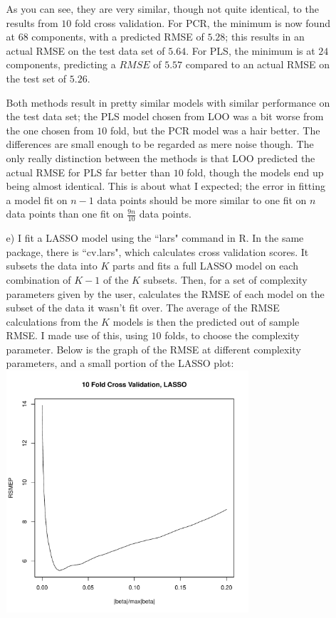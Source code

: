 \documentclass[11pt]{article}
\theoremstyle{definition}
\begin{document}
\begin{itemize}
\begin{itemize}
                As you can see, they are very similar, though not quite identical, to the results from $10$ fold cross validation. For PCR, the minimum is now found at $68$ components, with a predicted RMSE of $5.28$; this results in an actual RMSE on the test data set of $5.64$. For PLS, the minimum is at $24$ components, predicting a $RMSE$ of $5.57$ compared to an actual RMSE on the test set of $5.26$. \par
                Both methods result in pretty similar models with similar performance on the test data set; the PLS model chosen from LOO was a bit worse from the one chosen from $10$ fold, but the PCR model was a hair better. The differences are small enough to be regarded as mere noise though. The only really distinction between the methods is that LOO predicted the actual RMSE for PLS far better than $10$ fold, though the models end up being almost identical. This is about what I expected; the error in fitting a model fit on $n-1$ data points should be more similar to one fit on $n$ data points than one fit on $\frac{9n}{10}$ data points.
            \item[e)]
                I fit a LASSO model using the ``lars" command in R. In the same package, there is ``cv.lars", which calculates cross validation scores. It subsets the data into $K$ parts and fits a full LASSO model on each combination of $K-1$ of the $K$ subsets. Then, for a set of complexity parameters given by the user, calculates the RMSE of each model on the subset of the data it wasn't fit over. The average of the RMSE calculations from the $K$ models is then the predicted out of sample RMSE. I made use of this, using $10$ folds, to choose the complexity parameter.
 Below is the graph of the RMSE at different complexity parameters, and a small portion of the LASSO plot: \\   
                \includegraphics[width=9cm]{final/3e_cv_plot}

\end{itemize}
\end{itemize}
\end{document}

